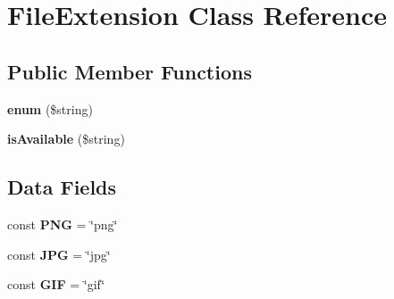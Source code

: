 \hypertarget{class_file_extension}{\section{File\+Extension Class Reference}
\label{class_file_extension}
}
\subsection*{Public Member Functions}
\begin{DoxyCompactItemize}
\item 
\hypertarget{class_file_extension_a7967c6e825979f8b2faefba3d95c3821}{{\bfseries enum} (\$string)}\label{class_file_extension_a7967c6e825979f8b2faefba3d95c3821}

\item 
\hypertarget{class_file_extension_a30537daeb912ea3e348c579c4f930841}{{\bfseries is\+Available} (\$string)}\label{class_file_extension_a30537daeb912ea3e348c579c4f930841}

\end{DoxyCompactItemize}
\subsection*{Data Fields}
\begin{DoxyCompactItemize}
\item 
\hypertarget{class_file_extension_ab7d2facbfa2e6427dceaf9459d1bc90e}{const {\bfseries P\+N\+G} = \char`\"{}png\char`\"{}}\label{class_file_extension_ab7d2facbfa2e6427dceaf9459d1bc90e}

\item 
\hypertarget{class_file_extension_a00c975c272576e50ec56386d2c632107}{const {\bfseries J\+P\+G} = \char`\"{}jpg\char`\"{}}\label{class_file_extension_a00c975c272576e50ec56386d2c632107}

\item 
\hypertarget{class_file_extension_a74ff3b35d1da410aa9e690f8734aa53f}{const {\bfseries G\+I\+F} = \char`\"{}gif\char`\"{}}\label{class_file_extension_a74ff3b35d1da410aa9e690f8734aa53f}

\end{DoxyCompactItemize}
